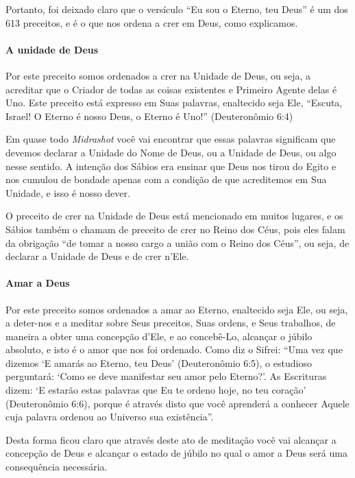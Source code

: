 Portanto, foi deixado claro que o versículo ``Eu sou o Eterno, teu
Deus'' é um dos 613 preceitos, e é o que nos ordena a crer em Deus, como
explicamos.

\paragraph{A unidade de Deus}

Por este preceito somos ordenados a crer na Unidade de Deus, ou seja, a
acreditar que o Criador de todas as coisas existentes e Primeiro Agente
delas é Uno. Este preceito está expresso em Suas palavras, enaltecido
seja Ele, ``Escuta, Israel! O Eterno é nosso Deus, o Eterno é Uno!''
(Deuteronômio 6:4)

Em quase todo \emph{Midrashot} você vai encontrar que essas palavras
significam que devemos declarar a Unidade do Nome de Deus, ou a Unidade
de Deus, ou algo nesse sentido. A intenção dos Sábios era ensinar que
Deus nos tirou do Egito e nos cumulou de bondade apenas com a condição
de que acreditemos em Sua Unidade, e isso é nosso dever.

O preceito de crer na Unidade de Deus está mencionado em muitos lugares,
e os Sábios também o chamam de preceito de crer no Reino dos Céus,
pois eles falam da obrigação ``de tomar a nosso cargo a união com o
Reino dos Céus'', ou seja, de declarar a Unidade de Deus e de crer
n'Ele.

\paragraph{Amar a Deus}

Por este preceito somos ordenados a amar ao Eterno, enaltecido seja
Ele, ou seja, a deter-nos e a meditar sobre Seus preceitos, Suas ordens,
e Seus trabalhos, de maneira a obter uma concepção d'Ele, e ao
concebê-Lo, alcançar o júbilo absoluto, e isto é o amor que nos foi
ordenado. Como diz o Sifrei: ``Uma vez que dizemos `E amarás ao Eterno,
teu Deus' (Deuteronômio 6:5), o estudioso perguntará: `Como se deve
manifestar seu amor pelo Eterno?'. As Escrituras dizem: `E estarão
estas palavras que Eu te ordeno hoje, no teu coração' (Deuteronômio
6:6), porque é através disto que você aprenderá a conhecer Aquele cuja
palavra ordenou ao Universo sua existência''.

Desta forma ficou claro que através deste ato de meditação você vai
alcançar a concepção de Deus e alcançar o estado de júbilo no qual o
amor a Deus será uma consequência necessária.

